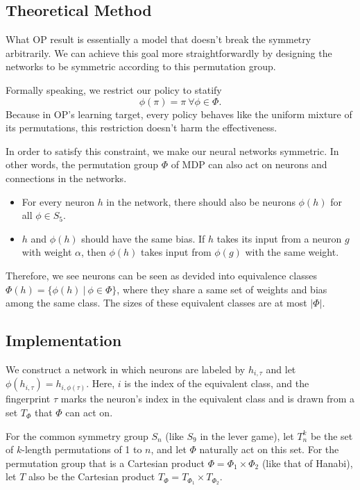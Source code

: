 \documentclass[12pt]{article}
\begin{document}
\begin{spacing}{1.15}
\subsection{Theoretical Method}

What OP result is essentially a model that doesn't break the symmetry arbitrarily. We can achieve this goal more straightforwardly by designing the networks to be symmetric according to this permutation group.

Formally speaking, we restrict our policy to statify \[\phi(\pi)=\pi~\forall\phi\in\Phi.\] Because in OP's learning target, every policy behaves like the uniform mixture of its permutations, this restriction doesn't harm the effectiveness.

In order to satisfy this constraint, we make our neural networks symmetric. In other words, the permutation group $\Phi$ of MDP can also act on neurons and connections in the networks.

\begin{itemize}
  \item For every neuron $h$ in the network, there should also be neurons $\phi(h)$ for all $\phi\in S_5$.
  \item $h$ and $\phi(h)$ should have the same bias. If $h$ takes its input from a neuron $g$ with weight $\alpha$, then $\phi(h)$ takes input from $\phi(g)$ with the same weight.
\end{itemize}

Therefore, we see neurons can be seen as devided into equivalence classes $\Phi(h) = \{\phi(h)~|~\phi\in\Phi\}$, where they share a same set of weights and bias among the same class. The sizes of these equivalent classes are at most $|\Phi|$.

\subsection{Implementation}

We construct a network in which neurons are labeled by $h_{i,\tau}$ and let $\phi(h_{i,\tau})=h_{i,\phi(\tau)}$. Here, $i$ is the index of the equivalent class, and the fingerprint $\tau$ marks the neuron's index in the equivalent class and is drawn from a set $T_\Phi$ that $\Phi$ can act on.

For the common symmetry group $S_n$ (like $S_9$ in the lever game), let $T_n^k$ be the set of $k$-length permutations of 1 to $n$, and let $\Phi$ naturally act on this set. For the permutation group that is a Cartesian product $\Phi=\Phi_1\times\Phi_2$ (like that of Hanabi), let $T$ also be the Cartesian product $T_\Phi=T_{\Phi_1}\times T_{\Phi_2}$.


\end{spacing}
\end{document}
